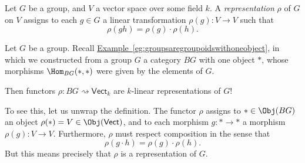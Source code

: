 \documentclass[notes.tex]{subfiles}
\begin{document}
\begin{example}
  \label{eg:functorscanbegrouprepresentation}
  Let $G$ be a group, and $V$ a vector space over some field $k$. A \emph{representation} $\rho$ of $G$ on $V$ assigns to each $g \in G$ a linear transformation $\rho(g)\colon V \to V$ such that
  \begin{equation*}
    \rho(gh) = \rho(g)\cdot \rho(h).
  \end{equation*}

  Let $G$ be a group. Recall \hyperref[eg:groupsaregroupoidswithoneobject]{Example~\ref*{eg:groupsaregroupoidswithoneobject}}, in which we constructed from a group $G$ a category $BG$ with one object $*$, whose morphisms $\Hom_{BG}(*, *)$ were given by the elements of $G$.

  Then functors $\rho\colon BG \rightsquigarrow \mathsf{Vect}_{k}$ are $k$-linear representations of $G$!

  To see this, let us unwrap the definition. The functor $\rho$ assigns to $* \in \Obj(BG)$ an object $\rho(*) = V \in \Obj(\mathsf{Vect})$, and to each morphism $g\colon * \to *$ a morphism $\rho(g)\colon V \to V$. Furthermore, $\rho$ must respect composition in the sense that
  \begin{equation*}
    \rho(g\cdot h) = \rho(g)\cdot \rho(h).
  \end{equation*}
  But this means precisely that $\rho$ is a representation of $G$.
\end{example}
\end{document}
